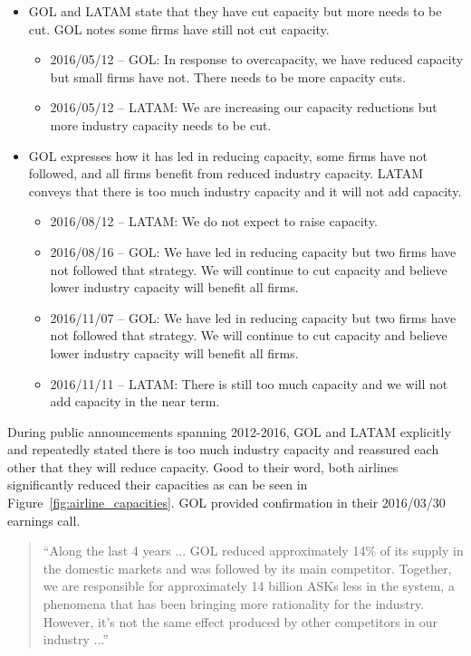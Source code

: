 \begin{itemize}
\item GOL and LATAM state that they have cut capacity but more needs to be
cut. GOL notes some firms have still not cut capacity.

\begin{itemize}
\item 2016/05/12 -- GOL: In response to overcapacity, we have reduced
capacity but small firms have not. There needs to be more capacity cuts.


\item 2016/05/12 -- LATAM: We are increasing our capacity reductions but
more industry capacity needs to be cut.
\end{itemize}

\item GOL expresses how it has led in reducing capacity, some firms have not
followed, and all firms benefit from reduced industry capacity. LATAM
conveys that there is too much industry capacity and it will not add
capacity.

\begin{itemize}
\item 2016/08/12 -- LATAM: We do not expect to raise capacity.

\item 2016/08/16 -- GOL: We have led in reducing capacity but two firms have
not followed that strategy. We will continue to cut capacity and believe
lower industry capacity will benefit all firms.

\item 2016/11/07 -- GOL: We have led in reducing capacity but two firms have
not followed that strategy. We will continue to cut capacity and believe
lower industry capacity will benefit all firms.

\item 2016/11/11 -- LATAM: There is still too much capacity and we will not
add capacity in the near term.
\end{itemize}
\end{itemize}

\medskip

During public announcements spanning 2012-2016, GOL and LATAM
explicitly and repeatedly stated there is too much industry capacity and
reassured each other that they will reduce capacity. Good to their word,
both airlines significantly reduced their capacities as can be seen in Figure~\ref{fig:airline_capacities}. GOL
provided confirmation in their 2016/03/30 earnings call. 

\begin{quote}
``Along the last 4 years ... GOL reduced approximately 14\% of its supply in the domestic markets 
and was followed by its main competitor. Together, we are responsible for approximately 
14 billion ASKs less in the system, a phenomena that has been bringing more rationality 
for the industry. However, it's not the same effect produced by other competitors in our industry ...''
\end{quote}

